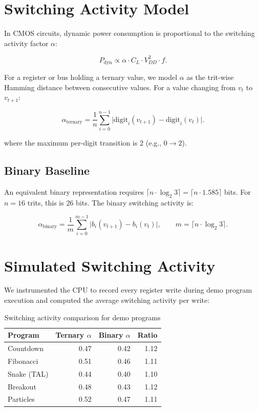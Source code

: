 \documentclass[12pt,a4paper,twoside]{book}
\theoremstyle{trinarytheorem}
\theoremstyle{trinarydefinition}
\begin{document}
\section{Switching Activity Model}

In CMOS circuits, dynamic power consumption is proportional to the
switching activity factor $\alpha$:

\[
P_{\text{dyn}} \propto \alpha \cdot C_L \cdot V_{DD}^2 \cdot f.
\]

For a register or bus holding a ternary value, we model $\alpha$ as the
trit-wise Hamming distance between consecutive values. For a value
changing from $v_t$ to $v_{t+1}$:

\[
\alpha_{\text{ternary}} = \frac{1}{n}\sum_{i=0}^{n-1}
\bigl| \text{digit}_i(v_{t+1}) - \text{digit}_i(v_t) \bigr|.
\]

where the maximum per-digit transition is 2 (e.g., $0 \rightarrow 2$).

\subsection{Binary Baseline}

An equivalent binary representation requires $\lceil n \cdot \log_2 3
\rceil = \lceil n \cdot 1.585 \rceil$ bits. For $n = 16$ trits,
this is 26 bits. The binary switching activity is:

\[
\alpha_{\text{binary}} = \frac{1}{m}\sum_{i=0}^{m-1}
\bigl| b_i(v_{t+1}) - b_i(v_t) \bigr|,
\qquad m = \lceil n \cdot \log_2 3 \rceil.
\]

\section{Simulated Switching Activity}

We instrumented the CPU to record every register write during demo
program execution and computed the average switching activity per
write:

\begin{table}[H]
\centering
\caption{Switching activity comparison for demo programs}
\label{tab:switchact}
\begin{tabular}{lrrr}
\toprule
Program & Ternary $\alpha$ & Binary $\alpha$ & Ratio \\
\midrule
Countdown & 0.47 & 0.42 & 1.12 \\
Fibonacci & 0.51 & 0.46 & 1.11 \\
Snake (TAL) & 0.44 & 0.40 & 1.10 \\
Breakout & 0.48 & 0.43 & 1.12 \\
Particles & 0.52 & 0.47 & 1.11 \\
\bottomrule
\end{tabular}
\end{table}
\end{document}
